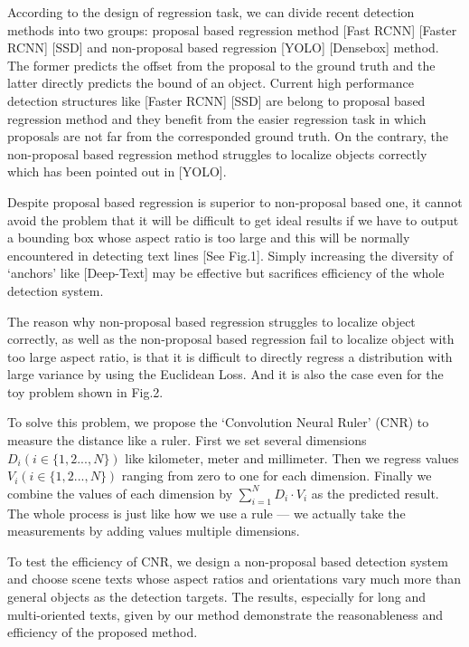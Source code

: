 \documentclass[10pt,twocolumn,letterpaper]{article}
\begin{document}
According to the design of regression task, we can divide recent detection methods into two groups: proposal based regression method [Fast RCNN] [Faster RCNN] [SSD] and non-proposal based regression [YOLO] [Densebox] method. The former predicts the offset from the proposal to the ground truth and the latter directly predicts the bound of an object. Current high performance detection structures like [Faster RCNN] [SSD] are belong to proposal based regression method and they benefit from the easier regression task in which proposals are not far from the corresponded ground truth. On the contrary, the non-proposal based regression method struggles to localize objects correctly which has been pointed out in [YOLO].

Despite proposal based regression is superior to non-proposal based one, it cannot avoid the problem that it will be difficult to get ideal results if we have to output a bounding box whose aspect ratio is too large and this will be normally encountered in detecting text lines [See Fig.1]. Simply increasing the diversity of ‘anchors’ like [Deep-Text] may be effective but sacrifices efficiency of the whole detection system.

The reason why non-proposal based regression struggles to localize object correctly, as well as the non-proposal based regression fail to localize object with too large aspect ratio, is that it is difficult to directly regress a distribution with large variance by using the Euclidean Loss. And it is also the case even for the toy problem shown in Fig.2.

To solve this problem, we propose the ‘Convolution Neural Ruler’ (CNR) to measure the distance like a ruler. First we set several dimensions $D_i (i\in \{1, 2 ..., N\})$ like kilometer, meter and millimeter. Then we regress values $V_i (i\in \{1, 2 ..., N\})$ ranging from zero to one for each dimension. Finally we combine the values of each dimension by $\sum_{i=1}^{N} D_{i} \cdot V_{i}$ as the predicted result. The whole process is just like how we use a rule --- we actually take the measurements by adding values multiple dimensions.

To test the efficiency of CNR, we design a non-proposal based detection system and choose scene texts whose aspect ratios and orientations vary much more than general objects as the detection targets. The results, especially for long and multi-oriented texts, given by our method demonstrate the reasonableness and efficiency of the proposed method.
\end{document}
